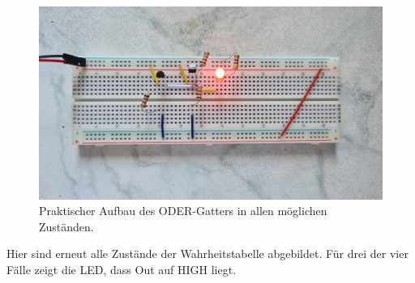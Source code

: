 \begin{figure}[h!]
\begin{minipage}{.5\textwidth}
	\end{minipage}%
	\begin{minipage}{.5\textwidth}
		\centering
		\includegraphics[scale=.05]{./Fotos/ODER-11.jpg}
	\end{minipage}
	\caption{Praktischer Aufbau des ODER-Gatters in allen möglichen Zuständen.}
\end{figure}
\newpage
Hier sind erneut alle Zustände der Wahrheitstabelle abgebildet. Für drei der vier Fälle zeigt die LED, dass Out auf HIGH liegt.